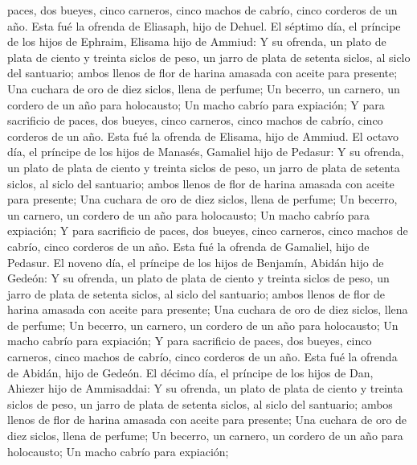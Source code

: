 paces, dos bueyes, cinco carneros, cinco machos de cabrío, cinco
corderos de un año. Esta fué la ofrenda de Eliasaph, hijo de Dehuel.
 El séptimo día, el príncipe de los hijos de Ephraim,
Elisama hijo de Ammiud:  Y su ofrenda, un plato de plata de
ciento y treinta siclos de peso, un jarro de plata de setenta siclos, al
siclo del santuario; ambos llenos de flor de harina amasada con aceite
para presente;  Una cuchara de oro de diez siclos, llena de
perfume;  Un becerro, un carnero, un cordero de un año para
holocausto;  Un macho cabrío para expiación; 
Y para sacrificio de paces, dos bueyes, cinco carneros, cinco machos de
cabrío, cinco corderos de un año. Esta fué la ofrenda de Elisama, hijo
de Ammiud.  El octavo día, el príncipe de los hijos de
Manasés, Gamaliel hijo de Pedasur:  Y su ofrenda, un plato
de plata de ciento y treinta siclos de peso, un jarro de plata de
setenta siclos, al siclo del santuario; ambos llenos de flor de harina
amasada con aceite para presente;  Una cuchara de oro de
diez siclos, llena de perfume;  Un becerro, un carnero, un
cordero de un año para holocausto;  Un macho cabrío para
expiación;  Y para sacrificio de paces, dos bueyes, cinco
carneros, cinco machos de cabrío, cinco corderos de un año. Esta fué la
ofrenda de Gamaliel, hijo de Pedasur.  El noveno día, el
príncipe de los hijos de Benjamín, Abidán hijo de Gedeón: 
Y su ofrenda, un plato de plata de ciento y treinta siclos de peso, un
jarro de plata de setenta siclos, al siclo del santuario; ambos llenos
de flor de harina amasada con aceite para presente;  Una
cuchara de oro de diez siclos, llena de perfume;  Un
becerro, un carnero, un cordero de un año para holocausto; 
Un macho cabrío para expiación;  Y para sacrificio de
paces, dos bueyes, cinco carneros, cinco machos de cabrío, cinco
corderos de un año. Esta fué la ofrenda de Abidán, hijo de Gedeón.
 El décimo día, el príncipe de los hijos de Dan, Ahiezer
hijo de Ammisaddai:  Y su ofrenda, un plato de plata de
ciento y treinta siclos de peso, un jarro de plata de setenta siclos, al
siclo del santuario; ambos llenos de flor de harina amasada con aceite
para presente;  Una cuchara de oro de diez siclos, llena de
perfume;  Un becerro, un carnero, un cordero de un año para
holocausto;  Un macho cabrío para expiación; 
